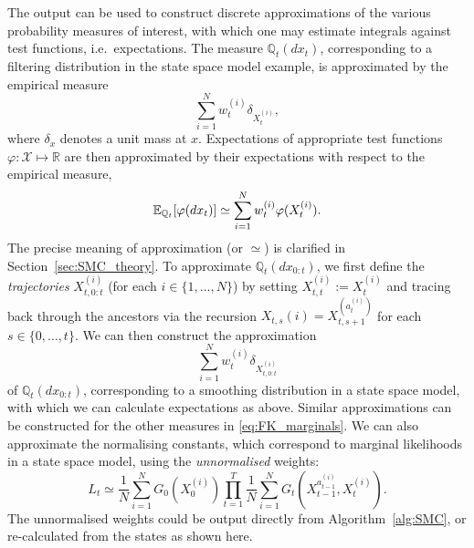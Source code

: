 The output can be used to construct discrete approximations of the various probability measures of interest, with which one may estimate integrals against test functions, i.e.\ expectations.
The measure $\mathbb{Q}_t(dx_t)$, corresponding to a filtering distribution in the state space model example, is approximated by the empirical measure
\begin{equation}
\sum_{i=1}^N w_t^{(i)} \delta_{ X_t^{(i)} } , \label{eq:emp_measure_filter}
\end{equation}
where $\delta_x$ denotes a unit mass at $x$.
Expectations of appropriate test functions $\varphi : \mathcal{X} \mapsto \mathbb{R}$ are then approximated by their expectations with respect to the empirical measure,
\begin{equation*}
\mathbb{E}_{\mathbb{Q}_t}[ \varphi(dx_t) ]
\simeq \sum_{i=1}^N w_t^{(i)} \varphi( X_t^{(i)} ) .
\end{equation*}
The precise meaning of approximation (or $\simeq$) is clarified in Section~\ref{sec:SMC_theory}.
To approximate $\mathbb{Q}_t(dx_{0:t})$, we first define the \emph{trajectories} $X_{t,0:t}^{(i)}$ (for each $i \in \{1,\dots,N\}$) by setting $X_{t,t}^{(i)} := X_t^{(i)}$ and tracing back through the ancestors via the recursion $X_{t,s}{(i)} = X_{t,s+1}^{( a_t^{(i)} )}$ for each $s \in \{0,\dots, t\}$. 
We can then construct the approximation
\begin{equation*}
\sum_{i=1}^N w_t^{(i)} \delta_{ X_{t,0:t}^{(i)} } 
\end{equation*}
of $\mathbb{Q}_t(dx_{0:t})$, corresponding to a smoothing distribution in a state space model, with which we can calculate expectations as above.
Similar approximations can be constructed for the other measures in \eqref{eq:FK_marginals}.
We can also approximate the normalising constants, which correspond to marginal likelihoods in a state space model, using the \emph{unnormalised} weights:
\begin{equation}\label{eq:likelihood_estimate}
L_t 
\simeq \frac{1}{N} \sum_{i=1}^N G_0(X_0^{(i)}) \prod_{t=1}^T \frac{1}{N}
        \sum_{i=1}^N G_t( X_{t-1}^{ a_{t-1}^{(i)} }, X_t^{(i)} ) .
\end{equation}
The unnormalised weights could be output directly from Algorithm~\ref{alg:SMC}, or re-calculated from the states as shown here.







